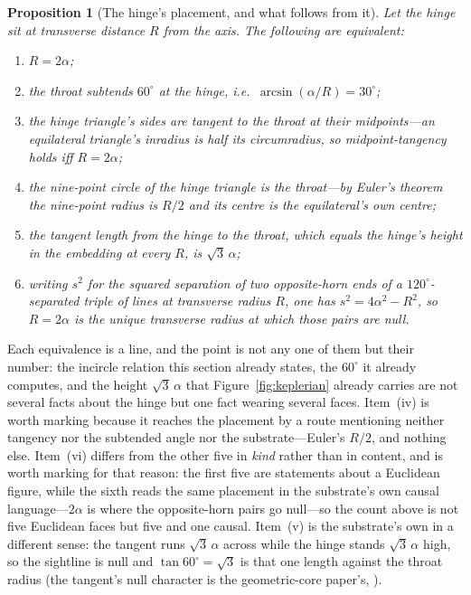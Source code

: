 \documentclass[11pt,a4paper]{article}
\newtheorem{proposition}[theorem]{Proposition}
\theoremstyle{definition}
\begin{document}
\begin{proposition}[The hinge's placement, and what follows from it]\label{prop:twoalpha}
Let the hinge sit at transverse distance $R$ from the axis. The following are equivalent:
\begin{enumerate}\itemsep0pt
\item $R=2\alpha$;
\item the throat subtends $60^{\circ}$ at the hinge, i.e.\ $\arcsin(\alpha/R)=30^{\circ}$;
\item the hinge triangle's sides are tangent to the throat \emph{at their midpoints}---an equilateral triangle's inradius is half its circumradius, so midpoint-tangency holds iff $R=2\alpha$;
\item the nine-point circle of the hinge triangle \emph{is} the throat---by Euler's theorem the nine-point radius is $R/2$ and its centre is the equilateral's own centre;
\item the tangent length from the hinge to the throat, which equals the hinge's height in the embedding at every $R$, is $\sqrt3\,\alpha$;
\item writing $s^{2}$ for the squared separation of two opposite-horn ends of a $120^{\circ}$-separated triple of lines at transverse radius $R$, one has $s^{2}=4\alpha^{2}-R^{2}$, so $R=2\alpha$ is the unique transverse radius at which those pairs are \emph{null}.
\end{enumerate}
\end{proposition}

\noindent Each equivalence is a line, and the point is not any one of them but their number: the incircle relation this section already states, the $60^{\circ}$ it already computes, and the height $\sqrt3\,\alpha$ that Figure~\ref{fig:keplerian} already carries are not several facts about the hinge but one fact wearing several faces. Item~(iv) is worth marking because it reaches the placement by a route mentioning neither tangency nor the subtended angle nor the substrate---Euler's $R/2$, and nothing else. Item~(vi) differs from the other five in \emph{kind} rather than in content, and is worth marking for that reason: the first five are statements about a Euclidean figure, while the sixth reads the same placement in the substrate's own causal language---$2\alpha$ is where the opposite-horn pairs go null---so the count above is not five Euclidean faces but five and one causal. Item~(v) is the substrate's own in a different sense: the tangent runs $\sqrt3\,\alpha$ across while the hinge stands $\sqrt3\,\alpha$ high, so the sightline is null and $\tan 60^{\circ}=\sqrt3$ is that one length against the throat radius (the tangent's null character is the geometric-core paper's, \cite{JanzenGeometricCore}).
\end{document}
